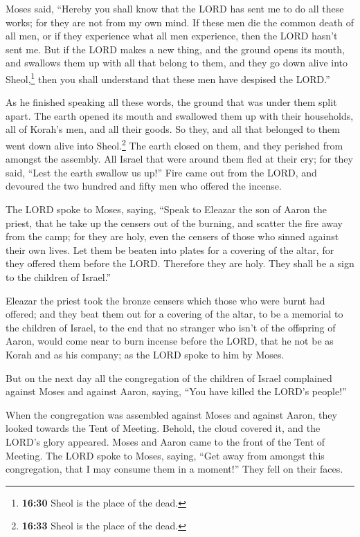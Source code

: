  Moses said, ``Hereby you shall know that the LORD has
sent me to do all these works; for they are not from my own mind.
 If these men die the common death of all men, or if they
experience what all men experience, then the LORD hasn't sent me.
 But if the LORD makes a new thing, and the ground opens
its mouth, and swallows them up with all that belong to them, and they
go down alive into Sheol,\footnote{\textbf{16:30} Sheol is the place of
  the dead.} then you shall understand that these men have despised the
LORD.''

 As he finished speaking all these words, the ground that
was under them split apart.  The earth opened its mouth
and swallowed them up with their households, all of Korah's men, and all
their goods.  So they, and all that belonged to them went
down alive into Sheol.\footnote{\textbf{16:33} Sheol is the place of the
  dead.} The earth closed on them, and they perished from amongst the
assembly.  All Israel that were around them fled at their
cry; for they said, ``Lest the earth swallow us up!'' 
Fire came out from the LORD, and devoured the two hundred and fifty men
who offered the incense.

 The LORD spoke to Moses, saying,  ``Speak
to Eleazar the son of Aaron the priest, that he take up the censers out
of the burning, and scatter the fire away from the camp; for they are
holy,  even the censers of those who sinned against their
own lives. Let them be beaten into plates for a covering of the altar,
for they offered them before the LORD. Therefore they are holy. They
shall be a sign to the children of Israel.''

 Eleazar the priest took the bronze censers which those
who were burnt had offered; and they beat them out for a covering of the
altar,  to be a memorial to the children of Israel, to
the end that no stranger who isn't of the offspring of Aaron, would come
near to burn incense before the LORD, that he not be as Korah and as his
company; as the LORD spoke to him by Moses.

 But on the next day all the congregation of the children
of Israel complained against Moses and against Aaron, saying, ``You have
killed the LORD's people!''

 When the congregation was assembled against Moses and
against Aaron, they looked towards the Tent of Meeting. Behold, the
cloud covered it, and the LORD's glory appeared.  Moses
and Aaron came to the front of the Tent of Meeting.  The
LORD spoke to Moses, saying,  ``Get away from amongst
this congregation, that I may consume them in a moment!'' They fell on
their faces.

